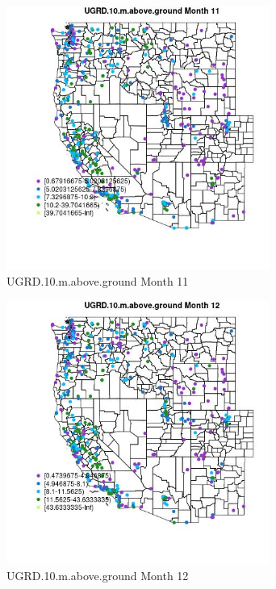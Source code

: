 \begin{figure} 
\centering  
\includegraphics[width=0.77\textwidth]{Code_Outputs/ML_input_report_ML_input_PM25_Step5_part_d_de_duplicated_aves_ML_input_MapObsMo11UGRD10maboveground.jpg} 
\caption{\label{fig:ML_input_report_ML_input_PM25_Step5_part_d_de_duplicated_aves_ML_inputMapObsMo11UGRD10maboveground}UGRD.10.m.above.ground Month 11} 
\end{figure} 
 

\begin{figure} 
\centering  
\includegraphics[width=0.77\textwidth]{Code_Outputs/ML_input_report_ML_input_PM25_Step5_part_d_de_duplicated_aves_ML_input_MapObsMo12UGRD10maboveground.jpg} 
\caption{\label{fig:ML_input_report_ML_input_PM25_Step5_part_d_de_duplicated_aves_ML_inputMapObsMo12UGRD10maboveground}UGRD.10.m.above.ground Month 12} 
\end{figure} 
 

